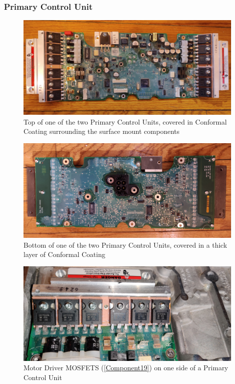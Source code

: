 \documentclass[]{formalLabReport}
\begin{document}
\subsubsection{Primary Control Unit}

\begin{figure}
    \includegraphics[]{entireBoardTop.jpg}
    \caption{Top of one of the two Primary Control Units, covered in Conformal Coating surrounding the surface mount components}
    \label{fig:entireBoardTop.jpg}
\end{figure}

\begin{figure}
    \includegraphics[]{entireBoardBottom.jpg}
    \caption{Bottom of one of the two Primary Control Units, covered in a thick layer of Conformal Coating}
    \label{fig:entireBoardBottom.jpg}
\end{figure}

\begin{figure}
    \includegraphics[]{segwayMotorDrivers.jpg}
    \caption{Motor Driver MOSFETS (\ref{Component19}) on one side of a Primary Control Unit}
    \label{fig:segwayMotorDrivers.jpg}
\end{figure}
\end{document}
